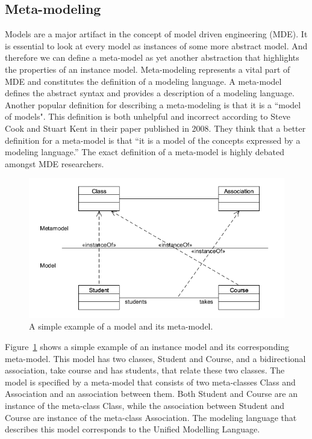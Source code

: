 \subsection{Meta-modeling}

Models are a major artifact in the concept of model driven engineering (MDE). It
is essential to look at every model as instances of some more abstract model.
And therefore we can define a meta-model as yet another abstraction that
highlights the properties of an instance model. Meta-modeling represents a vital
part of MDE and constitutes the definition of a modeling language. A meta-model
defines the abstract syntax and provides a description of a modeling language.
Another popular definition for describing a meta-modeling is that it is a
``model of models". This definition is both unhelpful and incorrect according
to Steve Cook and Stuart Kent in their paper\cite{Cook2008} published in 2008.
They think that a better definition for a meta-model is that ``it is a model of
the concepts expressed by a modeling language.'' The exact definition of a
meta-model is highly debated amongst MDE researchers\cite{Rutle_thesis}.

\begin{figure}[H]
	\centering
	\includegraphics[scale=0.6]{./Figures/SimpleMetamodel.png}
	\caption[Example of a model and meta-model]
	{A simple example of a model and its meta-model.}
	\label{fig:SimpleMeta-model}
\end{figure}

Figure~\ref{fig:SimpleMeta-model} shows a simple example of an instance model
and its corresponding meta-model. This model has two classes, Student and Course, and
a bidirectional association, take course and has students, that relate
these two classes. The model is specified by a meta-model that consists of two
meta-classes Class and Association and an association between them. Both Student
and Course are an instance of the meta-class Class, while the association
between Student and Course are instance of the meta-class Association. The
modeling language that describes this model corresponds to the Unified Modelling
Language.

